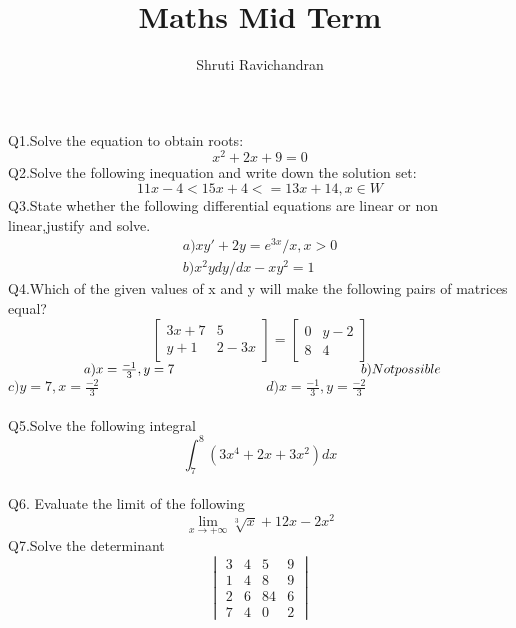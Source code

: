 \documentclass[12pt]{article}
\begin{document}
	\title{Maths Mid Term}
	\author{Shruti Ravichandran}
	\maketitle
	\newpage

	\hspace{-0.65cm}Q1.Solve the equation to obtain roots:
	\begin{equation*}
		x^2+2x+9=0
	\end{equation*}
	Q2.Solve the following inequation and write down the solution set:
	\begin{equation*}
		11x-4<15x+4<=13x+14,x\in W
	\end{equation*}
	Q3.State whether the following differential equations are linear or non linear,justify and solve.
	\begin{equation*}
		\begin{align}
			a)xy'+2y=e^{3x}/x,x>0\\
			b)x^2ydy/dx-xy^2=1 
		\end{align}
	\end{equation*}
	Q4.Which of the given values of x and y will make the following pairs of matrices equal?
	\begin{equation*}
		\begin{bmatrix}3x+7&5\\y+1&2-3x
		\end{bmatrix}=
		\begin{bmatrix}0&y-2\\8&4
		\end{bmatrix}
	\end{equation*}
	\vspace{0.5cm}
	$\hspace{2cm}a)x=\frac{-1}{3},y=7 \hspace{5cm} b)Not possible\newline \hspace*{1.85cm}$
	$ c)y=7,x=\frac{-2}{3} \hspace{5cm} d)x=\frac{-1}{3},y=\frac{-2}{3}$
	\\
	\\
	Q5.Solve the following integral
	\begin{equation*}
		\int_{7}^8 (3x^4+2x+3x^2)dx
	\end{equation*}
	\\
	Q6. Evaluate the limit of the following
\begin{equation*}
	\lim_{x \to +\infty}\sqrt[3]{x}+12x-2x^2
\end{equation*}
	Q7.Solve the determinant
\begin{equation*}
	\begin{vmatrix}3&4&5&9\\1&4&8&9\\2&6&84&6\\7&4&0&2
	\end{vmatrix}	
\end{equation*}
\newpage
\end{document}
